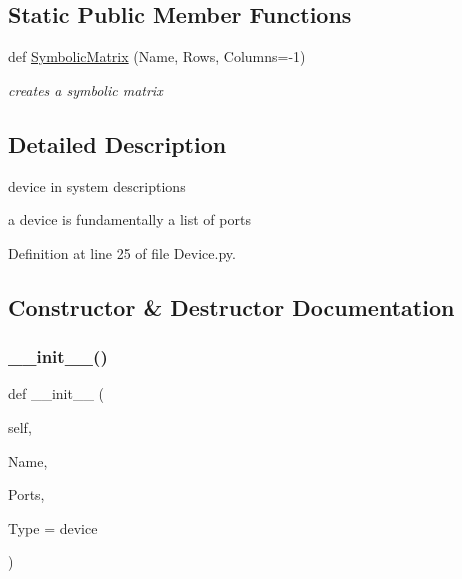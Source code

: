 \subsection*{Static Public Member Functions}
\begin{DoxyCompactItemize}
\item 
def \hyperlink{classSignalIntegrity_1_1SystemDescriptions_1_1Device_1_1Device_a2c70eb13042897e97cc142e6a0f69300}{Symbolic\+Matrix} (Name, Rows, Columns=-\/1)
\begin{DoxyCompactList}\small\item\em creates a symbolic matrix \end{DoxyCompactList}\end{DoxyCompactItemize}


\subsection{Detailed Description}
device in system descriptions 

a device is fundamentally a list of ports 

Definition at line 25 of file Device.\+py.



\subsection{Constructor \& Destructor Documentation}
\mbox{\label{classSignalIntegrity_1_1SystemDescriptions_1_1Device_1_1Device_aa13732b8be1d26511f983436259d282f}} 
\subsubsection{\texorpdfstring{\+\_\+\+\_\+init\+\_\+\+\_\+()}{\_\_init\_\_()}}
{\footnotesize\ttfamily def \+\_\+\+\_\+init\+\_\+\+\_\+ (\begin{DoxyParamCaption}\item[{}]{self,  }\item[{}]{Name,  }\item[{}]{Ports,  }\item[{}]{Type = {\ttfamily \textquotesingle{}device\textquotesingle{}} }\end{DoxyParamCaption})}



